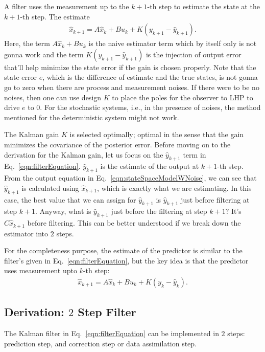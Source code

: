 A filter uses the measurement up to the $k+1$-th step to estimate the state at the $k+1$-th step. The estimate
\begin{align}
    \hat{x}_{k+1} = A \hat{x}_k + B u_k + K({y}_{k+1} - \hat{y}_{k+1}).
    \label{eqn:filterEquation}
\end{align}
Here, the term $A \hat{x}_k + B u_k$ is the naive estimator term which by itself only is not gonna work and the term $K({y}_{k+1} - \hat{y}_{k+1})$ is the injection of output error that'll help minimize the state error if the gain is chosen properly. Note that the state error $e$, which is the difference of estimate and the true states, is not gonna go to zero when there are process and measurement noises. If there were to be no noises, then one can use design $K$ to place the poles for the observer to LHP to drive $e$ to $0$. For the stochastic systems, i.e., in the presence of noises, the method mentioned for the deterministic system might not work.

The Kalman gain $K$ is selected optimally; optimal in the sense that the gain minimizes the covariance of the posterior error. Before moving on to the derivation for the Kalman gain, let us focus on the $\hat{y}_{k+1}$ term in Eq.~\ref{eqn:filterEquation}. $\hat{y}_{k+1}$ is the estimate of the output at $k+1$-th step. From the output equation in Eq.~\ref{eqn:stateSpaceModelWNoise}, we can see that $\hat{y}_{k+1}$ is calculated using $\hat{x}_{k+1}$, which is exactly what we are estimating. In this case, the best value that we can assign for $\hat{y}_{k+1}$ is $\hat{y}_{k+1}$ just before filtering at step $k+1$. Anyway, what is $\hat{y}_{k+1}$ just before the filtering at step $k+1$? It's $C \hat{x}_{k+1}$ before filtering. This can be better understood if we break down the estimator into $2$ steps.

For the completeness purpose, the estimate of the predictor is similar to the filter's given in Eq.~\ref{eqn:filterEquation}, but the key idea is that the predictor uses measurement upto $k$-th step:
\begin{align}
    \hat{x}_{k+1} = A \hat{x}_k + B u_k + K({y}_{k} - \hat{y}_{k}).
    \label{eqn:predictorEquation}
\end{align}

\subsection{Derivation: $2$ Step Filter}
\hspace{\parindent}The Kalman filter in Eq.~\ref{eqn:filterEquation} can be implemented in $2$ steps: prediction step, and correction step or data assimilation step.


